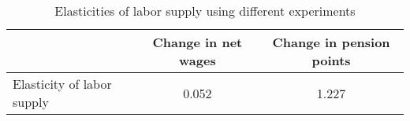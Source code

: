 \begin{table}[htbp]\caption{Elasticities of labor supply using different experiments}\label{table:elasticities}\centering\footnotesize\begin{tabular}{lcc} \toprule & Change in net wages & Change in pension points   \\\midrule    Elasticity of labor supply &0.052&1.227\\  \bottomrule\end{tabular}
      \end{table}